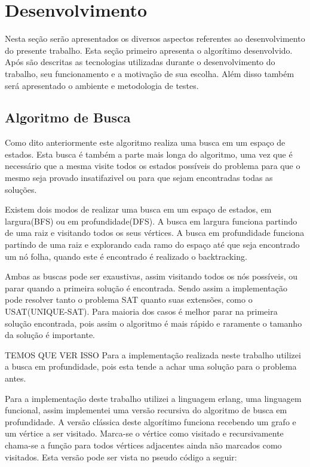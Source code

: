 \documentclass{ufsc-thesis}
\begin{document}
\chapter{Desenvolvimento}

Nesta seção serão apresentados os diversos aspectos referentes ao desenvolvimento
do presente trabalho. Esta seção primeiro apresenta o algorítimo desenvolvido. Após são 
descritas as tecnologias utilizadas durante o desenvolvimento do trabalho, seu 
funcionamento e a motivação de sua escolha. Além disso também será apresentado o ambiente 
e metodologia de testes.

\section{Algoritmo de Busca}

Como dito anteriormente este algoritmo realiza uma busca em um espaço de estados. Esta busca 
é também a parte mais longa do algoritmo, uma vez que é necessário que a mesma visite todos os
estados possíveis do problema para que o mesmo seja provado insatifazivel ou para que sejam encontradas 
todas as soluções.

Existem dois modos de realizar uma busca em um espaço de estados, em largura(BFS) ou em profundidade(DFS). 
A busca em largura funciona partindo de uma raiz e visitando todos os seus vértices. A busca em profundidade 
funciona partindo de uma raiz e explorando cada ramo do espaço até que seja encontrado um nó folha, 
quando este é encontrado é realizado o backtracking.

Ambas as buscas pode ser exaustivas, assim visitando todos os nós possíveis, ou parar quando a primeira 
solução é encontrada. Sendo assim a implementação pode resolver tanto o problema SAT quanto suas 
extensões, como o USAT(UNIQUE-SAT). Para maioria dos casos é melhor parar na primeira solução encontrada, 
pois assim o algoritmo é mais rápido e raramente o tamanho da solução é importante.

TEMOS QUE VER ISSO
Para a implementação realizada neste trabalho utilizei a busca em profundidade, pois esta tende a achar 
uma solução para o problema antes.

Para a implementação deste trabalho utilizei a linguagem erlang, uma linguagem funcional, assim implementei 
uma versão recursiva do algoritmo de busca em profundidade. A versão clássica deste algorítimo funciona 
recebendo um grafo e um vértice a ser visitado. Marca-se o vértice como visitado e recursivamente chama-se 
a função para todos vértices adjacentes ainda não marcados como visitados. Esta versão pode ser vista no
pseudo código a seguir:
\end{document}
